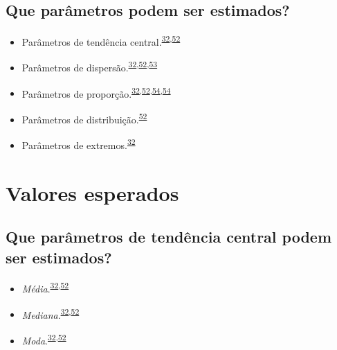 \documentclass[
]{book}
\begin{document}
\hypertarget{que-paruxe2metros-podem-ser-estimados}{%
\subsection{Que parâmetros podem ser estimados?}\label{que-paruxe2metros-podem-ser-estimados}}

\begin{itemize}
\item
  Parâmetros de tendência central.\textsuperscript{\protect\hyperlink{ref-Ali2016}{32},\protect\hyperlink{ref-kanji2006}{52}}
\item
  Parâmetros de dispersão.\textsuperscript{\protect\hyperlink{ref-Ali2016}{32},\protect\hyperlink{ref-kanji2006}{52},\protect\hyperlink{ref-Curran-Everett2008}{53}}
\item
  Parâmetros de proporção.\textsuperscript{\protect\hyperlink{ref-Ali2016}{32},\protect\hyperlink{ref-kanji2006}{52},\protect\hyperlink{ref-Altman1994}{54},\protect\hyperlink{ref-Altman1994}{54}}
\item
  Parâmetros de distribuição.\textsuperscript{\protect\hyperlink{ref-kanji2006}{52}}
\item
  Parâmetros de extremos.\textsuperscript{\protect\hyperlink{ref-Ali2016}{32}}
\end{itemize}

\hypertarget{valores-esperados}{%
\section{Valores esperados}\label{valores-esperados}}

\hypertarget{que-paruxe2metros-de-tenduxeancia-central-podem-ser-estimados}{%
\subsection{Que parâmetros de tendência central podem ser estimados?}\label{que-paruxe2metros-de-tenduxeancia-central-podem-ser-estimados}}

\begin{itemize}
\item
  \emph{Média}.\textsuperscript{\protect\hyperlink{ref-Ali2016}{32},\protect\hyperlink{ref-kanji2006}{52}}
\item
  \emph{Mediana}.\textsuperscript{\protect\hyperlink{ref-Ali2016}{32},\protect\hyperlink{ref-kanji2006}{52}}
\item
  \emph{Moda}.\textsuperscript{\protect\hyperlink{ref-Ali2016}{32},\protect\hyperlink{ref-kanji2006}{52}}
\end{itemize}
\end{document}
